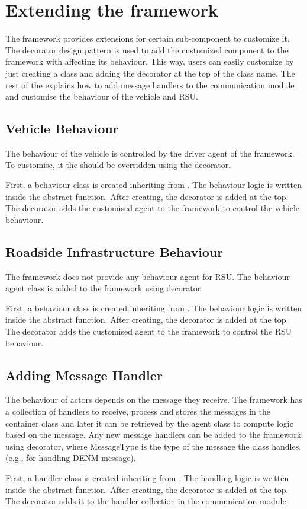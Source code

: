 \section{Extending the framework}
The framework provides extensions for certain sub-component to customize it. The decorator design pattern \cite{decorator} is used to add the customized component to the framework with affecting its behaviour. This way, users can easily customize by just creating a class and adding the decorator at the top of the class name. The rest of the explains how to add message handlers to the communication module and customise the behaviour of the vehicle and RSU.
\subsection{Vehicle Behaviour}
The behaviour of the vehicle is controlled by the driver agent of the framework. To customise, it the  should be overridden using the  decorator. 

First, a behaviour class is created inheriting from . The behaviour logic is written inside the  abstract function.  After creating,  the decorator is added at the top. The decorator adds the customised agent to the framework to control the vehicle behaviour.
\subsection{Roadside Infrastructure Behaviour}
The framework does not provide any behaviour agent for RSU. The behaviour agent class is added to the framework using  decorator. 

First, a behaviour class is created inheriting from . The behaviour logic is written inside the  abstract function. After creating, the decorator is added at the top. The decorator adds the customised agent to the framework to control the RSU behaviour.
\subsection{Adding Message Handler}
The behaviour of actors depends on the message they receive. The framework has a collection of handlers to receive, process and stores the messages in the container class and later it can be retrieved by the agent class to compute logic based on the message. Any new message handlers can be added to the framework using  decorator, where MessageType is the type of the message the class handles. (e.g.,  for handling DENM message).

First, a handler class is created inheriting from . The handling logic is written inside the  abstract function. After creating, the decorator is added at the top. The decorator adds it to the handler collection in the communication module.
